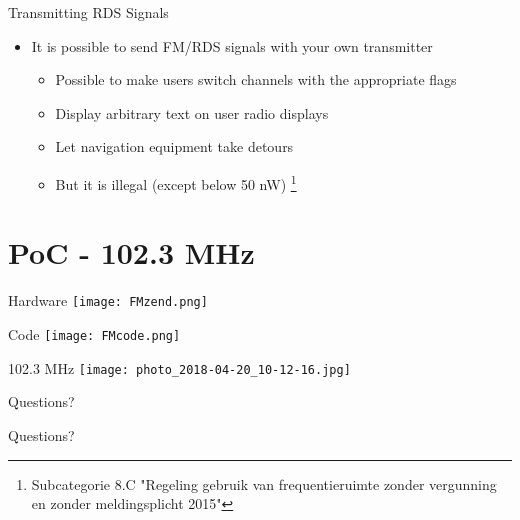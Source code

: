 \documentclass[10pt]{beamer}
\begin{document}
\begin{frame}{Transmitting RDS Signals}

\begin{itemize}
    \item It is possible to send FM/RDS signals with your own transmitter
    \begin{itemize}
        \item Possible to make users switch channels with the appropriate flags
        \item Display arbitrary text on user radio displays
        \item Let navigation equipment take detours
        \pause \item But it is illegal (except below 50 nW) \footnote{\tiny{Subcategorie 8.C "Regeling gebruik van frequentieruimte zonder vergunning en zonder meldingsplicht 2015"}}
    \end{itemize}
\end{itemize}



\end{frame}

\section{PoC - 102.3 MHz}
\begin{frame}{Hardware}
    \texttt{[image: FMzend.png]}
\end{frame}

\begin{frame}{Code}
    \texttt{[image: FMcode.png]}
\end{frame}

\begin{frame}{102.3 MHz}
    \texttt{[image: photo\_2018-04-20\_10-12-16.jpg]}
\end{frame}



\begin{frame}{Questions?}

Questions?

%
%
\end{frame}
\end{document}
